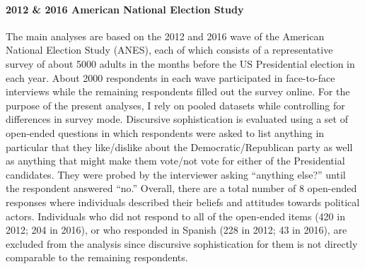 \paragraph{2012 \& 2016 American National Election Study}
The main analyses are based on the 2012 and 2016 wave of the American National Election Study (ANES), each of which consists of a representative survey of about 5000 adults in the months before the US Presidential election in each year. About 2000 respondents in each wave participated in face-to-face interviews while the remaining respondents filled out the survey online. For the purpose of the present analyses, I rely on pooled datasets while controlling for differences in survey mode. Discursive sophistication is evaluated using a set of open-ended questions in which respondents were asked to list anything in particular that they like/dislike about the Democratic/Republican party as well as anything that might make them vote/not vote for either of the Presidential candidates. They were probed by the interviewer asking ``anything else?'' until the respondent answered ``no.'' Overall, there are a total number of 8 open-ended responses where individuals described their beliefs and attitudes towards political actors. Individuals who did not respond to all of the open-ended items (420 in 2012; 204 in 2016), or who responded in Spanish (228 in 2012; 43 in 2016), are excluded from the analysis since discursive sophistication for them is not directly comparable to the remaining respondents.

